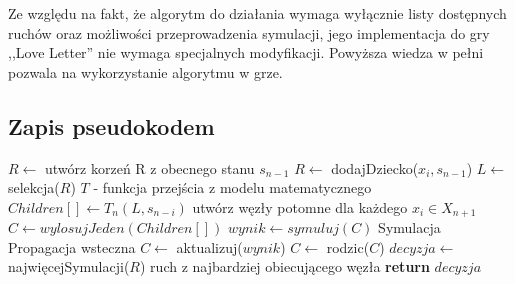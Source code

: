 Ze względu na fakt, że algorytm do działania wymaga wyłącznie listy dostępnych ruchów oraz możliwości przeprowadzenia symulacji, jego implementacja do gry ,,Love Letter'' nie wymaga specjalnych modyfikacji. Powyższa wiedza w pełni pozwala na wykorzystanie algorytmu w grze.
\subsection{Zapis pseudokodem}
\begin{algorithmic}[1]
		\State $R \gets $ utwórz korzeń R z obecnego stanu $s_{n-1}$
			\State $R \gets$ dodajDziecko($x_i, s_{n-1}$)  
		\EndFor
		\Repeat
			\State $L \gets $ selekcja($R$)
			 \Comment $T$ -  funkcja przejścia z modelu matematycznego
				\State $Children[] \gets T_n(L, s_{n-i}) $ \Comment utwórz węzły potomne dla każdego $x_i \in X_{n+1}$
				\State $C \gets wylosujJeden(Children[])$
				\State $wynik \gets symuluj(C)$	\Comment Symulacja
				\Repeat	\Comment Propagacja wsteczna
					\State $C \gets $ aktualizuj($wynik$)
					\State $C \gets $ rodzic($C$)
			\EndIf 
		\State $decyzja \gets$ najwięcejSymulacji($R$) \Comment ruch z najbardziej obiecującego węzła 
		\State \textbf{return} $decyzja$
	\EndFunction
\end{algorithmic}